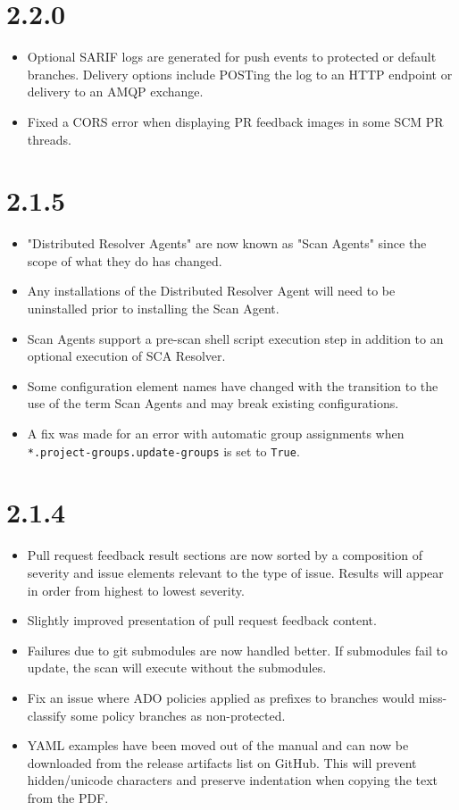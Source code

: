 \section{2.2.0}
\begin{itemize}
    \item Optional SARIF logs are generated for push events to protected or default branches.  Delivery options include POSTing
    the log to an HTTP endpoint or delivery to an AMQP exchange.
    \item Fixed a CORS error when displaying PR feedback images in some SCM PR threads.
\end{itemize}

\section{2.1.5}

\begin{itemize}
    \item "Distributed Resolver Agents" are now known as "Scan Agents" since the scope of what they do has changed.
    \item Any installations of the Distributed Resolver Agent will need to be uninstalled prior to installing the Scan Agent.
    \item Scan Agents support a pre-scan shell script execution step in addition to an optional execution of SCA Resolver.
    \item Some configuration element names have changed with the transition to the use of the term Scan Agents and may break
    existing configurations.
    \item A fix was made for an error with automatic group assignments when \texttt{*.project-groups.update-groups} is set
    to \texttt{True}.
\end{itemize}

\section{2.1.4}

\begin{itemize}
    \item Pull request feedback result sections are now sorted by a composition of severity and issue elements
    relevant to the type of issue.  Results will appear in order from highest to lowest severity.
    \item Slightly improved presentation of pull request feedback content.
    \item Failures due to git submodules are now handled better.  If submodules fail to update, the scan will execute without
    the submodules.
    \item Fix an issue where ADO policies applied as prefixes to branches would miss-classify some policy branches as non-protected.
    \item YAML examples have been moved out of the manual and can now be downloaded from the release artifacts list on GitHub.  This
    will prevent hidden/unicode characters and preserve indentation when copying the text from the PDF.
\end{itemize}

